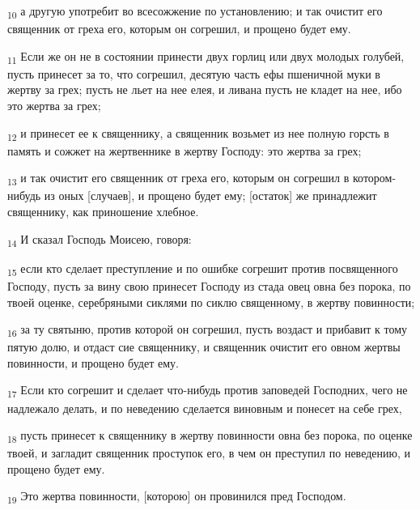 \begin{tcolorbox}
\textsubscript{10} а другую употребит во всесожжение по установлению; и так очистит его священник от греха его, которым он согрешил, и прощено будет ему.
\end{tcolorbox}
\begin{tcolorbox}
\textsubscript{11} Если же он не в состоянии принести двух горлиц или двух молодых голубей, пусть принесет за то, что согрешил, десятую часть ефы пшеничной муки в жертву за грех; пусть не льет на нее елея, и ливана пусть не кладет на нее, ибо это жертва за грех;
\end{tcolorbox}
\begin{tcolorbox}
\textsubscript{12} и принесет ее к священнику, а священник возьмет из нее полную горсть в память и сожжет на жертвеннике в жертву Господу: это жертва за грех;
\end{tcolorbox}
\begin{tcolorbox}
\textsubscript{13} и так очистит его священник от греха его, которым он согрешил в котором-нибудь из оных [случаев], и прощено будет ему; [остаток] же принадлежит священнику, как приношение хлебное.
\end{tcolorbox}
\begin{tcolorbox}
\textsubscript{14} И сказал Господь Моисею, говоря:
\end{tcolorbox}
\begin{tcolorbox}
\textsubscript{15} если кто сделает преступление и по ошибке согрешит против посвященного Господу, пусть за вину свою принесет Господу из стада овец овна без порока, по твоей оценке, серебряными сиклями по сиклю священному, в жертву повинности;
\end{tcolorbox}
\begin{tcolorbox}
\textsubscript{16} за ту святыню, против которой он согрешил, пусть воздаст и прибавит к тому пятую долю, и отдаст сие священнику, и священник очистит его овном жертвы повинности, и прощено будет ему.
\end{tcolorbox}
\begin{tcolorbox}
\textsubscript{17} Если кто согрешит и сделает что-нибудь против заповедей Господних, чего не надлежало делать, и по неведению сделается виновным и понесет на себе грех,
\end{tcolorbox}
\begin{tcolorbox}
\textsubscript{18} пусть принесет к священнику в жертву повинности овна без порока, по оценке твоей, и загладит священник проступок его, в чем он преступил по неведению, и прощено будет ему.
\end{tcolorbox}
\begin{tcolorbox}
\textsubscript{19} Это жертва повинности, [которою] он провинился пред Господом.
\end{tcolorbox}
